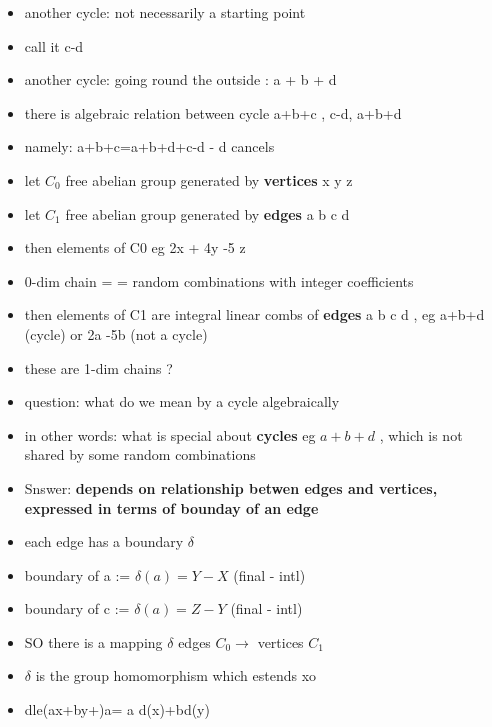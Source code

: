 \documentclass[10pt,landscape,a4paper]{article}
\begin{document}
\begin{multicols*}{4}
\begin{spacing}{0.1}
\begin{itemize}
  \item another cycle: not necessarily a starting point
  \item call it c-d
  \item another cycle: going round the outside : a + b + d
  \item there is algebraic relation between cycle a+b+c , c-d, a+b+d
  \item namely: a+b+c=a+b+d+c-d - d cancels
  \item let  $ C_0 $ free abelian group generated by \textbf{vertices} x y z
  \item let  $ C_1 $ free abelian group generated by \textbf{edges} a b c d
  \item then elements of C0 eg 2x + 4y -5 z
  \item 0-dim chain =  = random combinations with integer coefficients
  \item then elements of C1 are integral linear combs of \textbf{edges} a b c d , eg a+b+d (cycle) or 2a -5b (not a cycle)
  \item these are 1-dim chains ?
  \item question: what do we  mean by a cycle algebraically
  \item in other words: what is special about \textbf{cycles} eg $a+b+d$ , which is not shared by some random combinations
  \item Snswer: \textbf{depends on relationship betwen edges and vertices, expressed in terms of bounday of an edge}
  \item each edge has a boundary  $ \delta $ 
  \item boundary of a := $\delta(a)= Y - X$ (final - intl)
  \item boundary of c := $\delta(a)= Z - Y$ (final - intl)
  \item SO there is a mapping $\delta$ edges $ C_0 \rightarrow  $ vertices $ C_1 $ 
  \item $ \delta $ is the group homomorphism which estends xo
  \item dle(ax+by+)a= a d(x)+bd(y)
\end{itemize}


\end{spacing}
\end{multicols*}
\end{document}
